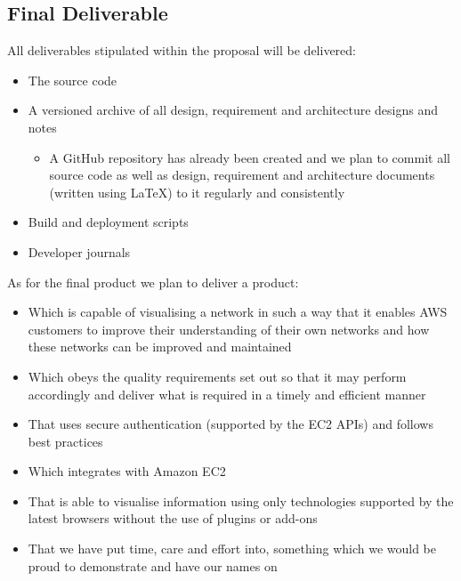 \documentclass{article}
\begin{document}
	\subsection{Final Deliverable}
		All deliverables stipulated within the proposal will be delivered:
		\begin{itemize}
			\item The source code
			\item A versioned archive of all design, requirement and architecture designs and notes
			\begin{itemize}
				\item A GitHub repository has already been created and we plan to commit all source code as well as design, requirement and architecture documents (written using LaTeX) to it regularly and consistently
			\end{itemize}
			\item Build and deployment scripts
			\item Developer journals
		\end{itemize}
		As for the final product we plan to deliver a product:
		\begin{itemize}
			\item Which is capable of visualising a network in such a way that it enables AWS customers to improve their understanding of their own networks and how these networks can be improved and maintained
			\item Which obeys the quality requirements set out so that it may perform accordingly and deliver what is required in a timely and efficient manner
			\item That uses secure authentication (supported by the EC2 APIs) and follows best practices
			\item Which integrates with Amazon EC2
			\item That is able to visualise information using only technologies supported by the latest browsers without the use of plugins or add-ons
			\item That we have put time, care and effort into, something which we would be proud to demonstrate and have our names on
		\end{itemize}
\end{document}
